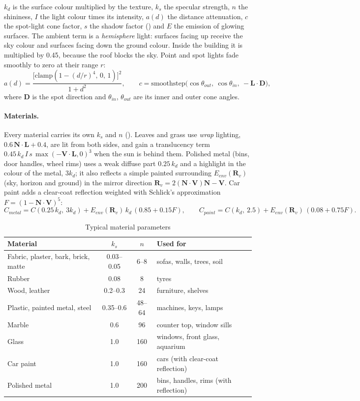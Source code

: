 $k_d$ is the surface colour multiplied by the texture, $k_s$ the specular strength, $n$ the shininess, $I$ the
light colour times its intensity, $a(d)$ the distance attenuation, $c$ the spot-light cone factor, $s$ the shadow
factor () and $E$ the emission of glowing surfaces. The ambient term is a \emph{hemisphere} light:
surfaces facing up receive the sky colour and surfaces facing down the ground colour. Inside the building it is
multiplied by 0.45, because the roof blocks the sky. Point and spot lights fade smoothly to zero at their
range $r$:
\[
a(d) = \frac{\big[\mathrm{clamp}(1-(d/r)^4,\,0,\,1)\big]^2}{1+d^2},\qquad
c = \mathrm{smoothstep}\big(\cos\theta_{out},\ \cos\theta_{in},\ -\mathbf{L}\cdot\mathbf{D}\big),
\]
where $\mathbf{D}$ is the spot direction and $\theta_{in}$, $\theta_{out}$ are its inner and outer cone angles.

\paragraph{Materials.} Every material carries its own $k_s$ and $n$ (). Leaves and grass
use \emph{wrap} lighting, $0.6\,\mathbf{N}\!\cdot\!\mathbf{L}+0.4$, are lit from both sides, and gain a translucency term
$0.45\,k_d\,I\,s\,\max(-\mathbf{V}\cdot\mathbf{L},0)^3$ when the sun is behind them. Polished metal (bins, door
handles, wheel rims) uses a weak diffuse part $0.25\,k_d$ and a highlight in the colour of the metal, $3k_d$; it
also reflects a simple painted surrounding $E_{env}(\mathbf{R}_v)$ (sky, horizon and ground) in the mirror direction
$\mathbf{R}_v=2(\mathbf{N}\cdot\mathbf{V})\mathbf{N}-\mathbf{V}$. Car paint adds a clear-coat reflection weighted with
Schlick's approximation $F=(1-\mathbf{N}\cdot\mathbf{V})^5$:
\[
C_{metal} = C(0.25\,k_d,\ 3k_d) + E_{env}(\mathbf{R}_v)\,k_d\,(0.85+0.15F),\qquad
C_{paint} = C(k_d,\ 2.5) + E_{env}(\mathbf{R}_v)\,(0.08+0.75F).
\]
\begin{table}[H]
\centering\small
\caption{Typical material parameters}\label{tab:materials}
\begin{tabular}{@{}lcc l@{}}
\toprule
Material & $k_s$ & $n$ & Used for \\ \midrule
Fabric, plaster, bark, brick, matte & 0.03--0.05 & 6--8 & sofas, walls, trees, soil \\
Rubber & 0.08 & 8 & tyres \\
Wood, leather & 0.2--0.3 & 24 & furniture, shelves \\
Plastic, painted metal, steel & 0.35--0.6 & 48--64 & machines, keys, lamps \\
Marble & 0.6 & 96 & counter top, window sills \\
Glass & 1.0 & 160 & windows, front glass, aquarium \\
Car paint & 1.0 & 160 & cars (with clear-coat reflection) \\
Polished metal & 1.0 & 200 & bins, handles, rims (with reflection) \\
\bottomrule
\end{tabular}
\end{table}

